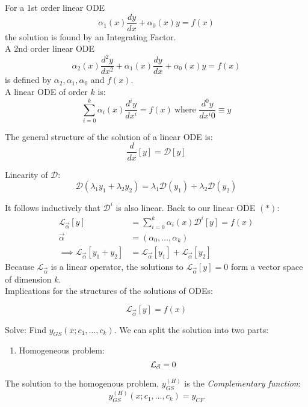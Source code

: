 \documentclass[10pt]{scrartcl}
\begin{document}


For a 1st order linear ODE
\[\alpha_1(x)\dfrac{dy}{dx} + \alpha_0(x)y = f(x)\]
the solution is found by an Integrating Factor.\\

A 2nd order linear ODE
\[\alpha_2(x)\dfrac{d^2y}{dx^2} + \alpha_1(x)\dfrac{dy}{dx} + \alpha_0(x)y = f(x)\]
is defined by $\alpha_2, \alpha_1, \alpha_0$ and $f(x)$.\\

A linear ODE of order $k$ is:
\[\sum_{i=0}^k \alpha_i(x) \frac{d^iy}{dx^i} = f(x)\ \text{where $\dfrac{d^0y}{dx^i0} \equiv y$}\tag{$*$}\]

The general structure of the solution of a linear ODE is: 
\[\frac{d}{dx}[y] = \mathcal{D}[y]\]

Linearity of $\mathcal{D}$:
\[\mathcal{D}(\lambda_1y_1 + \lambda_2y_2) = \lambda_1\mathcal{D}(y_1) +\lambda_2\mathcal{D}(y_2)\]

It follows inductively that $\mathcal{D}^i$ is also linear. Back to our linear ODE $(*)$: 
\[
\begin{aligned}
  \mathcal{L}_{\vec{\alpha}}[y] &= \sum_{i=0}^k \alpha_i(x)\mathcal{D}^i[y] = f(x)\\
  \vec{\alpha} &= (\alpha_0, \dots, \alpha_k)\\
  \implies \mathcal{L}_{\vec{\alpha}}[y_1 + y_2] &= \mathcal{L}_{\vec{\alpha}}[y_1] + \mathcal{L}_{\vec{\alpha}}[y_2]
\end{aligned}
\]
Because $\mathcal{L}_{\vec{\alpha}}$ is a linear operator, the solutions to $\mathcal{L}_{\vec{\alpha}}[y] = 0$ form a vector space of dimension $k$.\\

Implications for the structures of the solutions of ODEs:

\[\mathcal{L}_{\vec{\alpha}}[y] = f(x)\]

Solve: Find $y_{GS}(x; c_1,\dots,c_k)$. We can split the solution into two parts: 

\begin{enumerate}
  \item Homogeneous problem: 
  \[\mathcal{L}_{\vec{\alpha}} = 0\vspace*{-5pt}\]
    \end{enumerate}\vspace*{5pt}
    
    \begin{definition}
  The solution to the homogenous problem, $y_{GS}^{(H)}$ is the \emph{Complementary function}: 	
    \[y_{GS}^{(H)}(x;c_1,\dots,c_k) = y_{CF}\]
  \end{definition}\vspace*{5pt}
\end{document}
